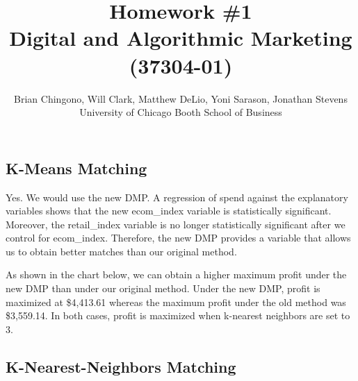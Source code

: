 



\title{Homework \#1\\
Digital and Algorithmic Marketing (37304-01)}
\author{Brian Chingono, Will Clark, Matthew DeLio, Yoni Sarason, Jonathan Stevens\\
University of Chicago Booth School of Business}

\maketitle

\section{} %

\subsection{K-Means Matching}

Yes. We would use the new DMP. A regression of spend against the explanatory variables shows that the new ecom\_index variable is statistically significant. Moreover, the retail\_index variable is no longer statistically significant after we control for ecom\_index. Therefore, the new DMP provides a variable that allows us to obtain better matches than our original method.

As shown in the chart below, we can obtain a higher maximum profit under the new DMP than under our original method. Under the new DMP, profit is maximized at \$4,413.61 whereas the maximum profit under the old method was \$3,559.14. In both cases, profit is maximized when k-nearest neighbors are set to 3.

\subsection{K-Nearest-Neighbors Matching}

\section{} %

